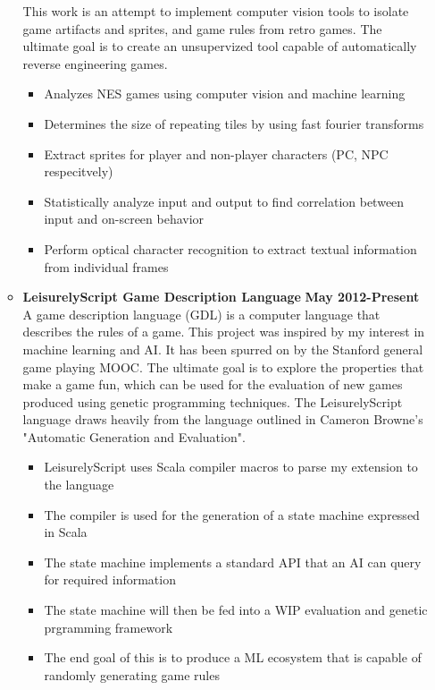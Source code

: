 \documentclass[overlapped]{res}
\begin{document}
\begin{resume}
\begin{itemize}[leftmargin=0in]
\begin{itemize}[leftmargin=0in]
\begin{samepage}
                    This work is an attempt to implement computer vision tools to isolate game artifacts and 
                    sprites, and game rules from retro games. The ultimate goal is to create an unsupervized tool capable of automatically 
                    reverse engineering games.
                    \begin{itemize}
                        \item[\textbullet] Analyzes NES games using computer vision and machine learning
                        \item[\textbullet] Determines the size of repeating tiles by using fast fourier transforms
                        \item[\textbullet] Extract sprites for player and non-player characters (PC, NPC respecitvely)
                        \item[\textbullet] Statistically analyze input and output to find correlation between input and on-screen behavior
                        \item[\textbullet] Perform optical character recognition to extract textual information from individual frames
                    \end{itemize}
                \end{samepage}
            \item[] 
                \begin{samepage}
                    \textbf{LeisurelyScript Game Description Language} \hfill \textbf{May 2012-Present} \\
                    A game description language (GDL) is a computer language that describes the rules of a game. 
                    This project was inspired by my interest in machine learning and AI. It has been spurred on by the 
                    Stanford general game playing MOOC. The ultimate goal is to explore the properties that make a game
                    fun, which can be used for the evaluation of new games produced using genetic programming techniques. 
                    The LeisurelyScript language draws heavily from the language 
                    outlined in Cameron Browne's "Automatic Generation and Evaluation".
                    \begin{itemize}
                        \item[\textbullet] LeisurelyScript uses Scala compiler macros to parse my extension to the language 
                        \item[\textbullet] The compiler is used for the generation of a state machine expressed in Scala 
                        \item[\textbullet] The state machine implements a standard API that an AI can query for required information
                        \item[\textbullet] The state machine will then be fed into a WIP evaluation and genetic prgramming framework
                        \item[\textbullet] The end goal of this is to produce a ML ecosystem that is capable of randomly generating game rules


\end{itemize}
\end{samepage}
\end{itemize}
\end{itemize}
\end{resume}
\end{document}
